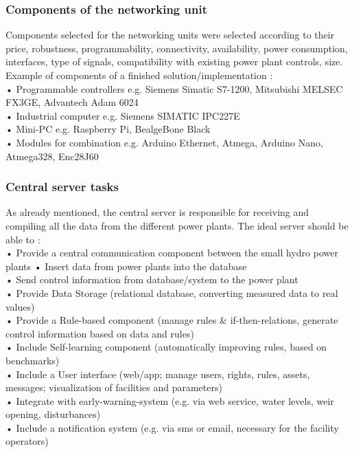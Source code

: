 \subsubsection{Components of the networking unit}
Components selected for the networking units were selected according to their price, robustness, programmability, connectivity, availability, power consumption, interfaces, type of signals, compatibility with existing power plant controls, size.\cite{SEIT2017} Example of components of a finished solution/implementation \cite{SEIT2017}:\\
• Programmable controllers e.g. Siemens Simatic S7-1200, Mitsubishi MELSEC FX3GE, Advantech Adam 6024\\
• Industrial computer e.g. Siemens SIMATIC IPC227E\\
• Mini-PC e.g. Raspberry Pi, BealgeBone Black\\
• Modules for combination e.g. Arduino Ethernet, Atmega, Arduino Nano, Atmega328, Enc28J60\\
\subsubsection{Central server tasks}
As already mentioned, the central server is responsible for receiving and compiling all the data from the different power plants. The ideal server should be able to \cite{SEIT2017}:\\
• Provide a central communication component between the small hydro power plants
\indent • Insert data from power plants into the database\\
\indent • Send control information from database/system to the power plant\\
• Provide Data Storage (relational database, converting measured data to real values)\\
• Provide a Rule-based component (manage rules \& if-then-relations, generate control information based on data and rules)\\
• Include Self-learning component (automatically improving rules, based on benchmarks)\\
• Include a User interface (web/app; manage users, rights, rules, assets, messages; visualization of facilities and parameters)\\
• Integrate with early-warning-system (e.g. via web service, water levels, weir opening, disturbances)\\
• Include a notification system (e.g. via sms or email, necessary for the facility operators)
